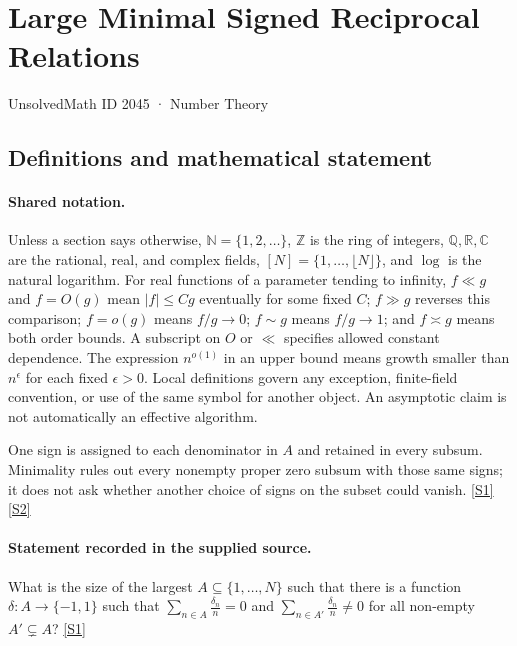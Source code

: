 \documentclass[11pt,a4paper]{article}
\newcommand{\N}{\mathbb{N}}
\newcommand{\Z}{\mathbb{Z}}
\newcommand{\Q}{\mathbb{Q}}
\newcommand{\R}{\mathbb{R}}
\newcommand{\C}{\mathbb{C}}
\newcommand{\sref}[2]{\hyperlink{source:#1:#2}{[S#2]}}
\begin{document}

\setcounter{section}{2044}

\section{Large Minimal Signed Reciprocal Relations}\label{2045}

{\small\sffamily UnsolvedMath ID 2045 · Number Theory}

\subsection{Definitions and mathematical statement}

\paragraph{Shared notation.}Unless a section says otherwise, $\N=\{1,2,\ldots\}$,
$\Z$ is the ring of integers, $\Q,\R,\C$ are the rational, real, and complex
fields, $[N]=\{1,\ldots,\lfloor N\rfloor\}$, and $\log$ is the natural
logarithm. For real functions of a parameter tending to infinity,
$f\ll g$ and $f=O(g)$ mean $|f|\leq Cg$ eventually for some fixed $C$;
$f\gg g$ reverses this comparison; $f=o(g)$ means $f/g\to0$;
$f\sim g$ means $f/g\to1$; and $f\asymp g$ means both order bounds.
A subscript on $O$ or $\ll$ specifies allowed constant dependence.
The expression $n^{o(1)}$ in an upper bound means growth smaller than
$n^\epsilon$ for each fixed $\epsilon>0$. Local definitions govern any
exception, finite-field convention, or use of the same symbol for another
object. An asymptotic claim is not automatically an effective algorithm.



One sign is assigned to each denominator in $A$ and retained in every subsum. Minimality rules out every nonempty proper zero subsum with those same signs; it does not ask whether another choice of signs on the subset could vanish. \sref{2045}{1} \sref{2045}{2}

\paragraph{Statement recorded in the supplied source.}
What is the size of the largest $A\subseteq \{1,\ldots,N\}$ such that there is a function $\delta:A\to \{-1,1\}$ such that $ \sum_{n\in A}\frac{\delta_n}{n}=0 $ and $ \sum_{n\in A'}\frac{\delta_n}{n}\neq 0 $ for all non-empty $A'\subsetneq A$? \sref{2045}{1}
\end{document}
